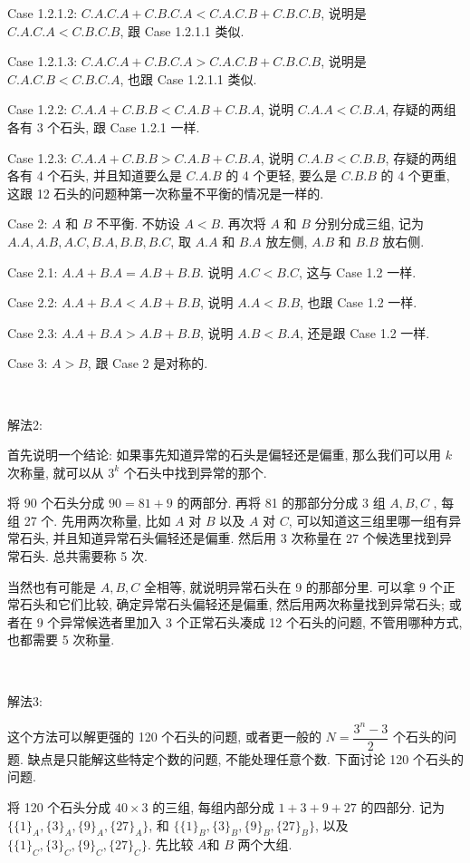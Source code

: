 Case 1.2.1.2: $ C.A.C.A + C.B.C.A < C.A.C.B + C.B.C.B $, 说明是 $ C.A.C.A < C.B.C.B $, 跟 Case 1.2.1.1 类似.

Case 1.2.1.3: $ C.A.C.A + C.B.C.A > C.A.C.B + C.B.C.B $, 说明是 $ C.A.C.B < C.B.C.A $, 也跟 Case 1.2.1.1 类似.

Case 1.2.2: $ C.A.A + C.B.B < C.A.B + C.B.A $, 说明 $ C.A.A < C.B.A $, 存疑的两组各有 3 个石头, 跟 Case 1.2.1 一样.

Case 1.2.3: $ C.A.A + C.B.B > C.A.B + C.B.A $, 说明 $ C.A.B < C.B.B $, 存疑的两组各有 4 个石头, 并且知道要么是 $ C.A.B $ 的 4 个更轻, 要么是 $ C.B.B $ 的 4 个更重, 这跟 12 石头的问题种第一次称量不平衡的情况是一样的. 

Case 2: $A$ 和 $B$ 不平衡. 不妨设 $A < B$. 再次将 $ A $ 和 $ B $ 分别分成三组, 记为 $A.A, A.B, A.C, B.A, B.B, B.C $, 取 $ A.A $ 和 $ B.A $ 放左侧, $ A.B $ 和 $B.B $ 放右侧.

Case 2.1: $ A.A + B.A = A.B + B.B $. 说明 $ A.C < B.C $, 这与 Case 1.2 一样.

Case 2.2: $ A.A + B.A < A.B + B.B $, 说明 $ A.A < B.B $, 也跟 Case 1.2 一样.

Case 2.3: $ A.A + B.A > A.B + B.B $, 说明 $ A.B < B.A $, 还是跟 Case 1.2 一样.

Case 3: $ A > B $, 跟 Case 2 是对称的.

~

\noindent 解法2:

首先说明一个结论: 如果事先知道异常的石头是偏轻还是偏重, 那么我们可以用 $k$ 次称量, 就可以从 $3^k$ 个石头中找到异常的那个.

将 90 个石头分成 $ 90 = 81 + 9 $ 的两部分. 再将 81 的那部分分成 3 组 $ A,B,C$ , 每组 27 个. 先用两次称量, 比如 $A$ 对 $B$ 以及 $A$ 对 $C$, 可以知道这三组里哪一组有异常石头, 并且知道异常石头偏轻还是偏重. 然后用 3 次称量在 27 个候选里找到异常石头. 总共需要称 5 次.

当然也有可能是 $ A, B, C $ 全相等, 就说明异常石头在 9 的那部分里. 可以拿 9 个正常石头和它们比较, 确定异常石头偏轻还是偏重, 然后用两次称量找到异常石头; 或者在 9 个异常候选者里加入 3 个正常石头凑成 12 个石头的问题, 不管用哪种方式, 也都需要 5 次称量.

~

\noindent 解法3:

这个方法可以解更强的 120 个石头的问题, 或者更一般的 $N = \dfrac{3^n - 3}{2}$ 个石头的问题. 缺点是只能解这些特定个数的问题, 不能处理任意个数. 下面讨论 120 个石头的问题.

将 120 个石头分成 $ 40\times 3 $ 的三组, 每组内部分成 $ 1 + 3 + 9 + 27 $ 的四部分. 记为 $ \{\{1\}_A, \{3\}_A, \{9\}_A, \{27\}_A \} $, 和 $ \{\{1\}_B, \{3\}_B, \{9\}_B, \{27\}_B \} $, 以及 $ \{\{1\}_C, \{3\}_C, \{9\}_C, \{27\}_C \} $. 先比较 $A$和 $B$ 两个大组.

